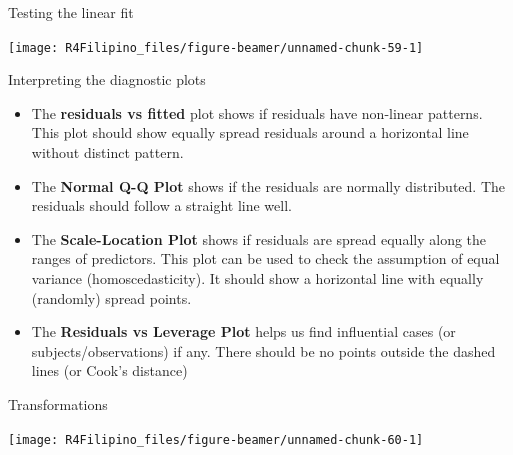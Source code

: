 \begin{frame}[fragile]{Testing the linear fit}

\begin{Shaded}
\begin{Highlighting}[]
\NormalTok{(}\NormalTok{(}\NormalTok{,}\NormalTok{))}
\end{Highlighting}
\end{Shaded}

\begin{center}\texttt{[image: R4Filipino\_files/figure-beamer/unnamed-chunk-59-1]} \end{center}

\end{frame}

\begin{frame}{Interpreting the diagnostic plots}

\begin{itemize}
\tightlist
\item
  The \textbf{residuals vs fitted} plot shows if residuals have
  non-linear patterns. This plot should show equally spread residuals
  around a horizontal line without distinct pattern.
\item
  The \textbf{Normal Q-Q Plot} shows if the residuals are normally
  distributed. The residuals should follow a straight line well.
\item
  The \textbf{Scale-Location Plot} shows if residuals are spread equally
  along the ranges of predictors. This plot can be used to check the
  assumption of equal variance (homoscedasticity). It should show a
  horizontal line with equally (randomly) spread points.
\item
  The \textbf{Residuals vs Leverage Plot} helps us find influential
  cases (or subjects/observations) if any. There should be no points
  outside the dashed lines (or Cook's distance)
\end{itemize}

\end{frame}

\begin{frame}[fragile]{Transformations}

\begin{Shaded}
\begin{Highlighting}[]
\NormalTok{(}\OperatorTok{+}\StringTok{ }\NormalTok{() }\OperatorTok{+}\StringTok{ }\NormalTok{(}\NormalTok{)}
\end{Highlighting}
\end{Shaded}

\begin{center}\texttt{[image: R4Filipino\_files/figure-beamer/unnamed-chunk-60-1]} \end{center}

\end{frame}

